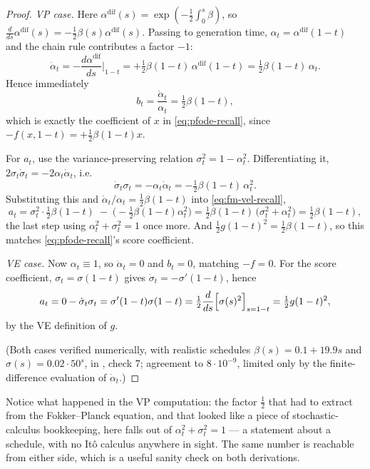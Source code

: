 \documentclass[11pt,a4paper]{report}
\theoremstyle{definition}
\theoremstyle{remark}
\begin{document}
\begin{proof}
\emph{VP case.} Here $\alpha^{\mathrm{dif}}(s)=\exp(-\tfrac12\int_0^s\beta)$,
so $\frac{d}{ds}\alpha^{\mathrm{dif}}(s) = -\tfrac12\beta(s)\alpha^{\mathrm{dif}}(s)$.
Passing to generation time, $\alpha_t=\alpha^{\mathrm{dif}}(1-t)$ and the
chain rule contributes a factor $-1$:
\[
\dot\alpha_t = -\frac{d\alpha^{\mathrm{dif}}}{ds}\Big|_{1-t}
= +\tfrac12\beta(1-t)\,\alpha^{\mathrm{dif}}(1-t)
= \tfrac12\beta(1-t)\,\alpha_t .
\]
Hence immediately
\[
b_t = \frac{\dot\alpha_t}{\alpha_t} = \tfrac12\beta(1-t) ,
\]
which is exactly the coefficient of $x$ in \eqref{eq:pfode-recall}, since
$-f(x,1-t) = +\tfrac12\beta(1-t)x$. \checkmark

For $a_t$, use the variance-preserving relation $\sigma_t^2 = 1-\alpha_t^2$.
Differentiating it, $2\sigma_t\dot\sigma_t = -2\alpha_t\dot\alpha_t$, i.e.
\[
\dot\sigma_t\sigma_t = -\alpha_t\dot\alpha_t = -\tfrac12\beta(1-t)\,\alpha_t^2 .
\]
Substituting this and $\dot\alpha_t/\alpha_t=\tfrac12\beta(1-t)$ into
\eqref{eq:fm-vel-recall},
\[
a_t = \sigma_t^2\cdot\tfrac12\beta(1-t) \;-\; \bigl(-\tfrac12\beta(1-t)\alpha_t^2\bigr)
    = \tfrac12\beta(1-t)\,\bigl(\sigma_t^2+\alpha_t^2\bigr)
    = \tfrac12\beta(1-t) ,
\]
the last step using $\alpha_t^2+\sigma_t^2=1$ once more. And
$\tfrac12g(1-t)^2 = \tfrac12\beta(1-t)$, so this matches
\eqref{eq:pfode-recall}'s score coefficient. \checkmark

\emph{VE case.} Now $\alpha_t\equiv1$, so $\dot\alpha_t=0$ and
$b_t=0$, matching $-f=0$. \checkmark
For the score coefficient, $\sigma_t=\sigma(1-t)$ gives
$\dot\sigma_t = -\sigma'(1-t)$, hence
\[
a_t = 0 - \dot\sigma_t\sigma_t = \sigma'(1-t)\sigma(1-t)
    = \tfrac12\frac{d}{ds}\Bigl[\sigma(s)^2\Bigr]_{s=1-t}
    = \tfrac12 g(1-t)^2 ,
\]
by the VE definition of $g$. \checkmark

(Both cases verified numerically, with realistic schedules
$\beta(s)=0.1+19.9s$ and $\sigma(s)=0.02\cdot50^{s}$, in
, check 7; agreement to $8\cdot10^{-9}$, limited only
by the finite-difference evaluation of $\dot\alpha_t$.)
\end{proof}

Notice what happened in the VP computation: the factor $\tfrac12$ that
 had to extract from the Fokker--Planck
equation, and that looked like a piece of stochastic-calculus bookkeeping,
here falls out of $\alpha_t^2+\sigma_t^2=1$ --- a statement about a
schedule, with no It\^o calculus anywhere in sight. The same number is
reachable from either side, which is a useful sanity check on both
derivations.
\end{document}
